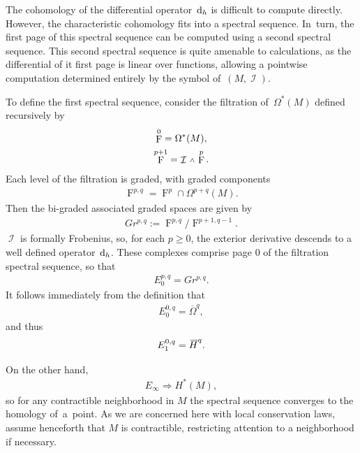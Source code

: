\documentclass[10pt,a4paper]{amsart}
\DeclareMathOperator{\I}{\mathcal{I}}
\renewcommand{\d}{{\rm d}}
\newcommand{\w}{{\mathchoice{\,{\scriptstyle\wedge}\,}{{\scriptstyle\wedge}}
 {{\scriptscriptstyle\wedge}}{{\scriptscriptstyle\wedge}}}}
\DeclareMathOperator{\pwf}{F}
\renewcommand{\dh}{\ensuremath{\hspace{1pt} \d_h}}
\newcommand{\barh}[1]{{}\mkern3mu\overline{\mkern-3mu H}^{#1}}
\newcommand{\Omegabar}{\overline{\Omega}}
\numberwithin{equation}{section}
\begin{document}
The cohomology of the differential operator $\dh$ is difficult to compute directly. However, the characteristic cohomology fits into a spectral sequence. In~turn, the first page of this spectral sequence can be computed using a second spectral sequence. This second spectral sequence is quite amenable to calculations, as the differential of it first page is linear over functions, allowing a pointwise computation determined entirely by the symbol of~$(M,\I)$.

To define the first spectral sequence, consider the filtration of~$\Omega^*(M)$ defined recursively by
\begin{gather*}
 \pwf^0 = \Omega^*(M), \\
 \pwf^{p+1} = \I\w \pwf^p .
\end{gather*}
Each level of the filtration is graded, with graded components
\begin{gather*}
\pwf^{p,q} = \pwf^p \cap \Omega^{p+q}(M) .
\end{gather*}
Then the bi-graded associated graded spaces are given by
\begin{gather*}
Gr^{p,q} := \pwf^{p,q}/\pwf^{p+1,q-1}.
\end{gather*}
$\I$ is formally Frobenius, so, for each $p\ge 0$, the exterior derivative descends to a well defined operator $\dh$. These complexes comprise page 0 of the filtration spectral sequence, so that
\begin{gather*}
E^{p,q}_0 = Gr^{p,q} .
\end{gather*}
It follows immediately from the definition that
\begin{gather*}
E^{0,q}_0 = \Omegabar^q ,
\end{gather*}
and thus
\begin{gather*}
E^{0,q}_1 = \barh{q} .
\end{gather*}

On the other hand,
\begin{gather*}
E_\infty \Rightarrow H^*(M) ,
\end{gather*}
so for any contractible neighborhood in $M$ the spectral sequence converges to the homology of~a~point. As we are concerned here with local conservation laws, assume henceforth that $M$ is contractible, restricting attention to a neighborhood if necessary.
\end{document}
